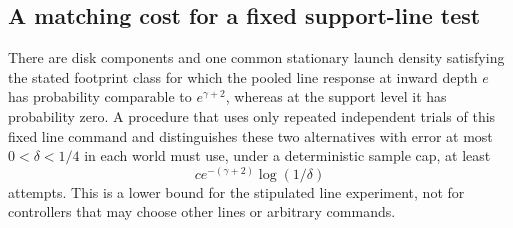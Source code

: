 \subsection{A matching cost for a fixed support-line test}
\begin{proposition}
\label{prop:line-depth-sharp}
There are disk components and one common stationary launch density
satisfying the stated footprint class for which the pooled line response
at inward depth $e$ has probability comparable to $e^{\gamma+2}$,
whereas at the support level it has probability zero. A procedure that
uses only repeated independent trials of this fixed line command and
distinguishes these two alternatives with error at most
$0<\delta<1/4$ in each world must use, under a deterministic sample cap,
at least
\[
                         c e^{-(\gamma+2)}\log(1/\delta)
\]
attempts. This is a lower bound for the stipulated line experiment,
not for controllers that may choose other lines or arbitrary commands.
\end{proposition}

